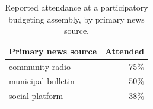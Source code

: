 \begin{table}[htbp]
\centering
\caption{Reported attendance at a participatory budgeting assembly, by primary news source.}
\label{tab:attendance-by-news-source}
\begin{tabular}{lr}
\toprule
Primary news source & Attended \\
\midrule
community radio & 75\% \\
municipal bulletin & 50\% \\
social platform & 38\% \\
\bottomrule
\end{tabular}
\end{table}
